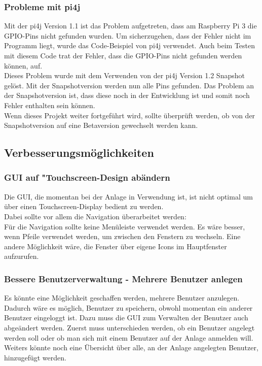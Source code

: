 \subsubsection{Probleme mit pi4j}\label{subsubsec:ProblemePi4j} 
Mit der \ac{pi4j} Version 1.1 ist das Problem aufgetreten, dass am Raspberry Pi 3 die \ac{GPIO}-Pins nicht gefunden wurden. Um sicherzugehen, dass der Fehler nicht im Programm liegt, wurde das Code-Beispiel von \ac{pi4j} verwendet. Auch beim Testen mit diesem Code trat der Fehler, dass die \ac{GPIO}-Pins nicht gefunden werden können, auf.
\\ Dieses Problem wurde mit dem Verwenden von der \ac{pi4j} Version 1.2 Snapshot gelöst. Mit der Snapshotversion werden nun alle Pins gefunden. Das Problem an der Snapshotversion ist, dass diese noch in der Entwicklung ist und somit noch Fehler enthalten sein können.
\\ Wenn dieses Projekt weiter fortgeführt wird, sollte überprüft werden, ob von der Snapshotversion auf eine Betaversion gewechselt werden kann.

\subsection{Verbesserungsmöglichkeiten}
\subsubsection{GUI auf "Touchscreen-Design\grqq{} abändern}
Die \ac{GUI}, die momentan bei der Anlage in Verwendung ist, ist nicht optimal um über einen Touchscreen-Display bedient zu werden.
\\ Dabei sollte vor allem die Navigation überarbeitet werden: 
\\Für die Navigation sollte keine Menüleiste verwendet werden. Es wäre besser, wenn Pfeile verwendet werden, um zwischen den Fenstern zu wechseln. Eine andere Möglichkeit wäre, die Fenster über eigene Icons im Hauptfenster aufzurufen.
\subsubsection{Bessere Benutzerverwaltung - Mehrere Benutzer anlegen}
Es könnte eine Möglichkeit geschaffen werden, mehrere Benutzer anzulegen. Dadurch wäre es möglich, Benutzer zu speichern, obwohl momentan ein anderer Benutzer eingeloggt ist. Dazu muss die \ac{GUI} zum Verwalten der Benutzer auch abgeändert werden. Zuerst muss unterschieden werden, ob ein Benutzer angelegt werden soll oder ob man sich mit einem Benutzer auf der Anlage anmelden will. Weiters könnte noch eine Übersicht über alle, an der Anlage angelegten Benutzer, hinzugefügt werden.
